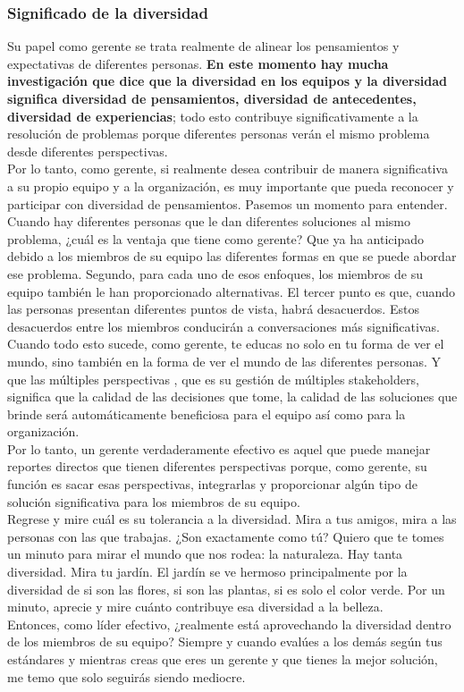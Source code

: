 \documentclass[10pt]{book}
\begin{document}
\subsubsection{Significado de la diversidad}
Su papel como gerente se trata realmente de alinear los pensamientos y expectativas de diferentes personas. \textbf{En este momento hay mucha investigación que dice que la diversidad en los equipos y la diversidad significa diversidad de pensamientos, diversidad de antecedentes, diversidad de experiencias}; todo esto contribuye significativamente a la resolución de problemas porque diferentes personas verán el mismo problema desde diferentes perspectivas.\\
Por lo tanto, como gerente, si realmente desea contribuir de manera significativa a su propio equipo y a la organización, es muy importante que pueda reconocer y participar con diversidad de pensamientos. Pasemos un momento para entender. Cuando hay diferentes personas que le dan diferentes soluciones al mismo problema, ¿cuál es la ventaja que tiene como gerente? Que ya ha anticipado debido a los miembros de su equipo las diferentes formas en que se puede abordar ese problema. Segundo, para cada uno de esos enfoques, los miembros de su equipo también le han proporcionado alternativas. El tercer punto es que, cuando las personas presentan diferentes puntos de vista, habrá desacuerdos. Estos desacuerdos entre los miembros conducirán a conversaciones más significativas. Cuando todo esto sucede, como gerente, te educas no solo en tu forma de ver el mundo, sino también en la forma de ver el mundo de las diferentes personas. Y que las múltiples perspectivas , que es su gestión de múltiples stakeholders, significa que la calidad de las decisiones que tome, la calidad de las soluciones que brinde será automáticamente beneficiosa para el equipo así como para la organización.\\
Por lo tanto, un gerente verdaderamente efectivo es aquel que puede manejar reportes directos que tienen diferentes perspectivas porque, como gerente, su función es sacar esas perspectivas, integrarlas y proporcionar algún tipo de solución significativa para los miembros de su equipo.\\
Regrese y mire cuál es su tolerancia a la diversidad. Mira a tus amigos, mira a las personas con las que trabajas. ¿Son exactamente como tú? Quiero que te tomes un minuto para mirar el mundo que nos rodea: la naturaleza. Hay tanta diversidad. Mira tu jardín. El jardín se ve hermoso principalmente por la diversidad de si son las flores, si son las plantas, si es solo el color verde. Por un minuto, aprecie y mire cuánto contribuye esa diversidad a la belleza.\\
Entonces, como líder efectivo, ¿realmente está aprovechando la diversidad dentro de los miembros de su equipo? Siempre y cuando evalúes a los demás según tus estándares y mientras creas que eres un gerente y que tienes la mejor solución, me temo que solo seguirás siendo mediocre.
\end{document}
